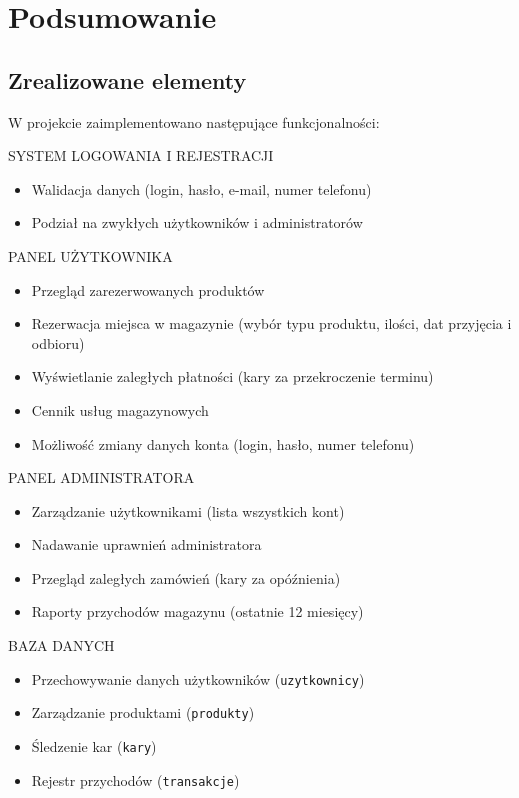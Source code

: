 \chapter{Podsumowanie}
\label{chap:Podsumowanie}

\section{Zrealizowane elementy}
\label{sec:Zrealizowane elementy}
W projekcie zaimplementowano następujące funkcjonalności:


SYSTEM LOGOWANIA I REJESTRACJI
\begin{itemize}
\item Walidacja danych (login, hasło, e-mail, numer telefonu)
\item Podział na zwykłych użytkowników i administratorów
\end{itemize}

PANEL UŻYTKOWNIKA
\begin{itemize}
\item Przegląd zarezerwowanych produktów
\item Rezerwacja miejsca w magazynie (wybór typu produktu, ilości, dat przyjęcia i odbioru)
\item Wyświetlanie zaległych płatności (kary za przekroczenie terminu)
\item Cennik usług magazynowych
\item Możliwość zmiany danych konta (login, hasło, numer telefonu)
\end{itemize}

PANEL ADMINISTRATORA
\begin{itemize}
\item Zarządzanie użytkownikami (lista wszystkich kont)
\item Nadawanie uprawnień administratora
\item Przegląd zaległych zamówień (kary za opóźnienia)
\item Raporty przychodów magazynu (ostatnie 12 miesięcy)
\end{itemize}

BAZA DANYCH
\begin{itemize}
\item Przechowywanie danych użytkowników (\texttt{uzytkownicy})
\item Zarządzanie produktami (\texttt{produkty})
\item Śledzenie kar (\texttt{kary})
\item Rejestr przychodów (\texttt{transakcje})
\end{itemize}

